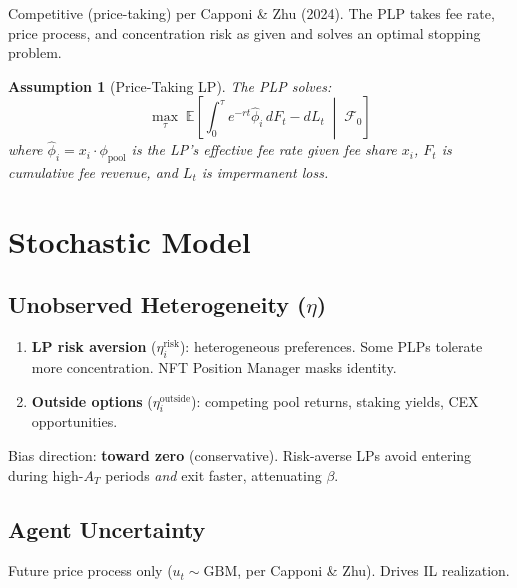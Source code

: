 \documentclass[11pt,a4paper]{article}
\newtheorem{assumption}{Assumption}
\begin{document}
Competitive (price-taking) per Capponi \& Zhu (2024). The PLP takes fee
rate, price process, and concentration risk as given and solves an optimal
stopping problem.

\begin{assumption}[Price-Taking LP]\label{asm:price-taking}
The PLP solves:
\begin{equation}
  \max_{\tau} \; \mathbb{E}\left[\int_0^\tau e^{-rt}
  \hat\phi_i \, dF_t - dL_t \;\middle|\; \mathcal{F}_0\right]
\end{equation}
where $\hat\phi_i = x_i \cdot \phi_{\text{pool}}$ is the LP's effective fee
rate given fee share $x_i$, $F_t$ is cumulative fee revenue, and $L_t$ is
impermanent loss.
\end{assumption}


\section{Stochastic Model}\label{sec:stochastic-model}

\subsection{Unobserved Heterogeneity ($\eta$)}

\begin{enumerate}
  \item \textbf{LP risk aversion} ($\eta_i^{\text{risk}}$): heterogeneous
        preferences. Some PLPs tolerate more concentration. NFT Position
        Manager masks identity.

  \item \textbf{Outside options} ($\eta_i^{\text{outside}}$): competing pool
        returns, staking yields, CEX opportunities.
\end{enumerate}

Bias direction: \textbf{toward zero} (conservative). Risk-averse LPs avoid
entering during high-$A_T$ periods \emph{and} exit faster, attenuating
$\beta$.

\subsection{Agent Uncertainty}

Future price process only ($u_t \sim \text{GBM}$, per Capponi \& Zhu).
Drives IL realization.
\end{document}
